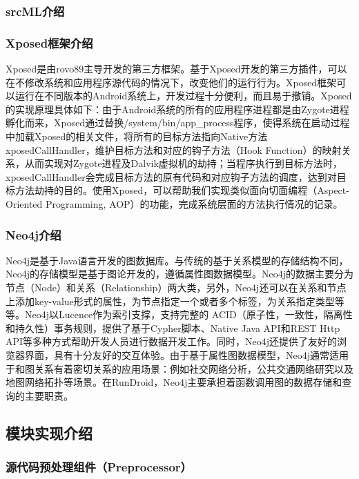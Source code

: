 \subsubsection{	srcML介绍}

\subsubsection{Xposed框架介绍}
Xposed是由rovo89主导开发的第三方框架。基于Xposed开发的第三方插件，可以在不修改系统和应用程序源代码的情况下，改变他们的运行行为。Xposed框架可以运行在不同版本的Android系统上，开发过程十分便利，而且易于撤销。Xposed的实现原理具体如下：由于Android系统的所有的应用程序进程都是由Zygote进程孵化而来，Xposed通过替换/system/bin/app\_process程序，使得系统在启动过程中加载Xposed的相关文件，将所有的目标方法指向Native方法xposedCallHandler，维护目标方法和对应的钩子方法（Hook Function）的映射关系，从而实现对Zygote进程及Dalvik虚拟机的劫持；当程序执行到目标方法时，xposedCallHandler会完成目标方法的原有代码和对应钩子方法的调度，达到对目标方法劫持的目的。使用Xposed，可以帮助我们实现类似面向切面编程（Aspect-Oriented Programming, AOP）的功能，完成系统层面的方法执行情况的记录。
\subsubsection{	Neo4j介绍}
Neo4j是基于Java语言开发的图数据库。与传统的基于关系模型的存储结构不同，Neo4j的存储模型是基于图论开发的，遵循属性图数据模型。Neo4j的数据主要分为节点（Node）和关系（Relationship）两大类，另外，Neo4j还可以在关系和节点上添加key-value形式的属性，为节点指定一个或者多个标签，为关系指定类型等等。Neo4j以Lucence作为索引支撑，支持完整的 ACID（原子性，一致性，隔离性和持久性）事务规则，提供了基于Cypher脚本、Native Java API和REST Http API等多种方式帮助开发人员进行数据开发工作。同时，Neo4j还提供了友好的浏览器界面，具有十分友好的交互体验。由于基于属性图数据模型，Neo4j通常适用于和图关系有着密切关系的应用场景：例如社交网络分析，公共交通网络研究以及地图网络拓扑等场景。在RunDroid，Neo4j主要承担着函数调用图的数据存储和查询的主要职责。

\subsection{模块实现介绍}


\subsubsection{源代码预处理组件（Preprocessor）}

